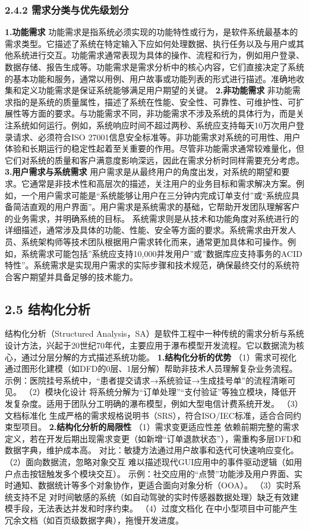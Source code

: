 \subsubsection{2.4.2 需求分类与优先级划分}\label{ux9700ux6c42ux5206ux7c7bux4e0eux4f18ux5148ux7ea7ux5212ux5206} \textbf{1.功能需求}
功能需求是指系统必须实现的功能特性或行为，是软件系统最基本的需求类型。它描述了系统在特定输入下应如何处理数据、执行任务以及与用户或其他系统进行交互。功能需求通常表现为具体的操作、流程和行为，例如用户登录、数据存储、报告生成等。功能需求是需求分析中的核心内容，它们直接决定了系统的基本功能和服务，通常以用例、用户故事或功能列表的形式进行描述。准确地收集和定义功能需求是保证系统能够满足用户期望的关键。
\textbf{2.非功能需求}
非功能需求指的是系统的质量属性，描述了系统在性能、安全性、可靠性、可维护性、可扩展性等方面的要求。与功能需求不同，非功能需求不涉及系统的具体行为，而是关注系统如何运行。例如，系统响应时间不超过两秒、系统应支持每天10万次用户登录请求、必须符合ISO
27001信息安全标准等。非功能需求对系统的可用性、用户体验和长期运行的稳定性起着至关重要的作用。尽管非功能需求通常较难量化，但它们对系统的质量和客户满意度影响深远，因此在需求分析时同样需要充分考虑。
\textbf{3.用户需求与系统需求}
用户需求是从最终用户的角度出发，对系统的期望和要求。它通常是非技术性和高层次的描述，关注用户的业务目标和需求解决方案。例如，一个用户需求可能是``系统能够让用户在三分钟内完成订单支付''或``系统应具备简洁直观的用户界面''。用户需求是系统需求的基础，它帮助开发团队理解客户的业务需求，并明确系统的目标。
系统需求则是从技术和功能角度对系统进行的详细描述，通常涉及具体的功能、性能、安全等方面的要求。系统需求由开发人员、系统架构师等技术团队根据用户需求转化而来，通常更加具体和可操作。例如，系统需求可能包括''系统应支持10,000并发用户''或''数据库应支持事务的ACID特性''。系统需求是实现用户需求的实际步骤和技术规范，确保最终交付的系统符合客户期望并具备足够的技术能力。
\subsection{2.5 结构化分析}\label{ux7ed3ux6784ux5316ux5206ux6790} 结构化分析（Structured
Analysis，SA）是软件工程中一种传统的需求分析与系统设计方法，兴起于20世纪70年代，主要应用于瀑布模型开发流程。它以数据流为核心，通过分层分解的方式描述系统功能。 \textbf{1.结构化分析的优势} （1）需求可视化
通过图形化建模（如DFD的0层、1层分解）帮助非技术人员理解复杂业务流程。 示例：医院挂号系统中，``患者提交请求→系统验证→生成挂号单''的流程清晰可见。 （2）模块化设计
将系统分解为``订单处理''``支付验证''等独立模块，降低开发复杂度。适用于团队分工明确的瀑布模型，例如大型电信计费系统开发。 （3）文档标准化 生成严格的需求规格说明书（SRS），符合ISO/IEC标准，适合合同约束型项目。
\textbf{2.结构化分析的局限性} （1）需求变更适应性差 依赖前期完整的需求定义，若在开发后期出现需求变更（如新增``订单退款状态''），需重构多层DFD和数据字典，维护成本高。 对比：敏捷方法通过用户故事和迭代可快速响应变化。
（2）面向数据流，忽略对象交互 难以描述现代GUI应用中的事件驱动逻辑（如用户点击按钮触发多个模块交互）。 示例：社交应用的``点赞''功能涉及用户界面、实时通知、数据统计等多个对象协作，更适合面向对象分析（OOA）。
（3）实时系统支持不足 对时间敏感的系统（如自动驾驶的实时传感器数据处理）缺乏有效建模手段，无法表达并发和时序约束。 （4）过度文档化 在中小型项目中可能产生冗余文档（如百页级数据字典），拖慢开发进度。
